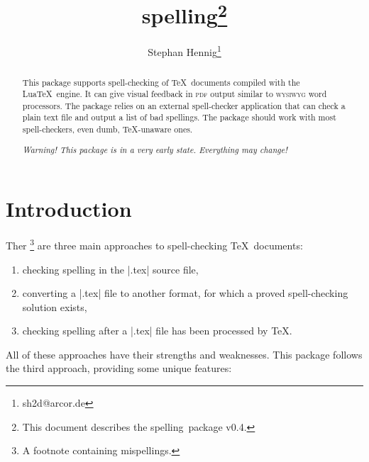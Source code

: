 \documentclass[11pt]{article}
\newcommand*{\pkg}{\textsf{spelling}}
\newcommand*{\acr}[1]{\mbox{\scshape#1}}
\begin{document}
\author{Stephan Hennig\thanks{sh2d@arcor.de}}
\title{\pkg\thanks{This document describes the \pkg\ package v0.4.}}
\maketitle


\begin{abstract}
  This package supports spell-checking of \TeX\ documents compiled with
  the Lua\TeX\ engine.  It can give visual feedback in \acr{pdf} output
  similar to \acr{wysiwyg} word processors.  The package relies on an
  external spell-checker application that can check a plain text file
  and output a list of bad spellings.  The package should work with most
  spell-checkers, even dumb, \TeX-unaware ones.

  \emph{Warning!  This package is in a very early state.  Everything may
    change!}
\end{abstract}

\begin{multicols}{2}
\small
\makeatletter
\renewcommand{\@tocrmarg}{2.55em plus1fil}
\makeatother
\tableofcontents
\end{multicols}


\section{Introduction}
\label{sec:intro}

Ther%
\footnote{A footnote containing mispellings.}
%
are three main approaches to spell-checking \TeX\ documents:

\begin{enumerate}

\item checking spelling in the |.tex| source file,

\item converting a |.tex| file to another format, for which a proved
  spell-checking solution exists,

\item checking spelling after a |.tex| file has been processed by \TeX.

\end{enumerate}

All of these approaches have their strengths and weaknesses.  This
package follows the third approach, providing some unique features:
\end{document}
